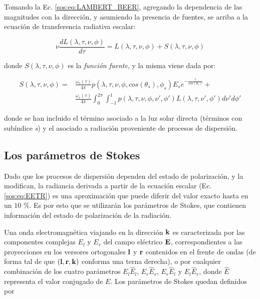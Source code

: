         Tomando la Ec. \ref{sos:eq:LAMBERT_BEER}, agregando la dependencia de las magnitudes con la dirección, y asumiendo la presencia de fuentes, se arriba a la ecuación de transferencia radiativa escalar:
        
        \begin{equation}
        \boxed{\nu \frac{d L(\lambda,\tau,\nu,\phi)}{d\tau}=L(\lambda,\tau,\nu,\phi)+S(\lambda,\tau,\nu,\phi)}
        \label{sos:eq:EETR}
        \end{equation}
        
        \noindent donde $S(\lambda,\tau,\nu,\phi)$ es la \textit{función fuente}, y la misma viene dada por:
        
        \begin{equation}
        \begin{split}
        S(\lambda,\tau,\nu,\phi) =&\frac{\omega_{s}(\tau)}{4 \pi} 
        p(\lambda,\tau,\nu,\phi,cos(\theta_{s}),\phi_{s}) E_{s} e^{-\frac{\tau}{cos(\theta_{s})}} 
        +\\ &\frac{\omega_{s}(\tau)}{4 \pi} \int_{0}^{2\pi} 
        \int_{-1}^{1} p(\lambda,\tau,\nu,\phi,\nu',\phi') L(\lambda,\tau,\nu',\phi')d\nu'd\phi'
        \end{split}
        \label{sos:eq:fuente_escalar}
        \end{equation}
        
        \noindent donde se han incluido el término asociado a la luz solar directa (términos con subíndice \textit{s}) y el asociado a radiación proveniente de procesos de dispersión.
        
    \subsection{Los parámetros de Stokes}
    \label{sos:s:stokes}
        
        Dado que los procesos de dispersión dependen del estado de polarización, y la modifican, la radiancia derivada a partir de la ecuación escalar (Ec. \ref{sos:eq:EETR}) es una aproximación que puede diferir del valor exacto hasta en un $10$ \%. Es por esto que se utilizarán los parámetros de Stokes, que contienen información del estado de polarización de la radiación.
        
        Una onda electromagnética viajando en la dirección $\bf{k}$ es caracterizada por las componentes complejas $E_{l}$ y $E_{r}$ del campo eléctrico $\bf{E}$, correspondientes a las proyecciones en los versores ortogonales $\bf{l}$ y $\bf{r}$ contenidos en el frente de ondas (de forma tal de que $(\bf{l},\bf{r},\bf{k})$ conforma una terna derecha), o por cualquier combinación de los cuatro parámetros $E_{l}\hat{E}_{l}$, $E_{r}\hat{E}_{r}$, $E_{r}\hat{E}_{l}$ y $E_{l}\hat{E}_{r}$, donde $\hat{E}$ representa el valor conjugado de $E$. Los parámetros de Stokes quedan definidos por
        
